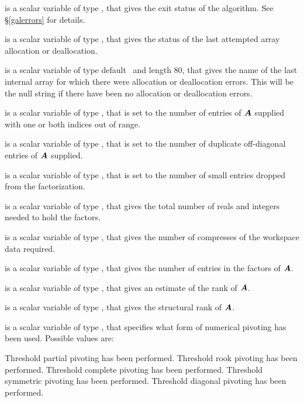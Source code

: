 \documentclass{galahad}
\begin{document}
\begin{description}

 is a scalar variable of type \integer, that gives the
exit status of the algorithm.
See \S\ref{galerrors}
for details.

 is a scalar variable of type \integer, that gives
the status of the last attempted array allocation or deallocation.

 is a scalar variable of type default \character\
and length 80, that  gives the name of the last internal array
for which there were allocation or deallocation errors.
This will be the null string if there have been no
allocation or deallocation errors.


 is a scalar variable of type \longinteger,
that is set to the number of
entries of ${\bm{A}}$ supplied with one or both indices out of range.

 is a scalar variable of type \longinteger,
that is set to the number of duplicate off-diagonal entries of ${\bm{A}}$ supplied.

 is a scalar variable of type \longinteger,
that is set to the number of small entries dropped from the factorization.

 is a scalar variable of type \longinteger,
that gives the total number of reals and integers needed to hold the
factors.

 is a scalar variable of type \integer,
that gives the number of compresses of the workspace data required.

 is a scalar variable of type \longinteger,
that gives the number of entries in the factors of ${\bm{A}}$.

 is a scalar variable of type \integer,
that gives an estimate of the rank of ${\bm{A}}$.

 is a scalar variable of type \integer,
that gives the structural rank of ${\bm{A}}$.

 is a scalar variable of type \integer,
that specifies what form of numerical pivoting has been used.
Possible values are:
\begin{description}
   Threshold partial pivoting has been performed.
   Threshold rook pivoting has been performed.
   Threshold complete pivoting has been performed.
   Threshold symmetric pivoting has been performed.
   Threshold diagonal pivoting has been performed.
\end{description}


\end{description}
\end{document}
